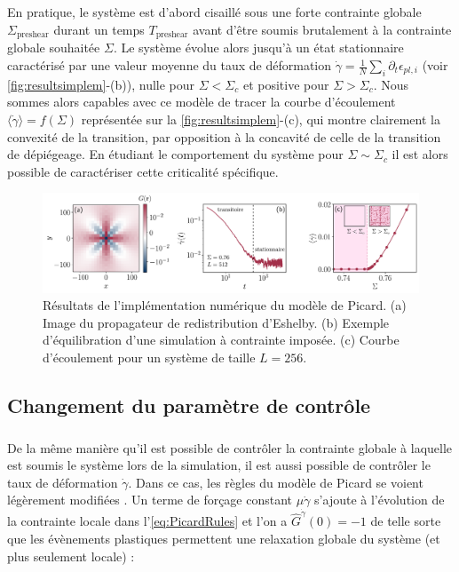 \subparagraph{}En pratique, le système est d'abord cisaillé sous une forte contrainte globale $\Sigma_\text{preshear}$ durant un temps $T_\text{preshear}$ avant d'être soumis brutalement à la contrainte globale souhaitée $\Sigma$. Le système évolue alors jusqu'à un état stationnaire caractérisé par une valeur moyenne du taux de déformation $ \dot{\gamma}  = \frac{1}{N}\sum_{i}\partial_t\epsilon_{pl,i}$ (voir \autoref{fig:resultsimplem}-(b)), nulle pour $\Sigma<\Sigma_c$ et positive pour $\Sigma>\Sigma_c$. Nous sommes alors capables avec ce modèle de tracer la courbe d'écoulement $\langle \dot{\gamma} \rangle = f(\Sigma)$ représentée sur la \autoref{fig:resultsimplem}-(c), qui montre clairement la convexité de la transition, par opposition à la concavité de celle de la transition de dépiégeage. En étudiant le comportement du système pour $\Sigma \sim \Sigma_c$ il est alors possible de caractériser cette criticalité spécifique.

\begin{figure}[h]
	\centering
	\includegraphics[width=\textwidth]{Chapitre4/Figures/Methode/ModeleResults.pdf}
	\caption{Résultats de l'implémentation numérique du modèle de Picard. (a) Image du propagateur de redistribution d'Eshelby. (b) Exemple d'équilibration d'une simulation à contrainte imposée. (c) Courbe d'écoulement pour un système de taille $L=256$.}
	\label{fig:resultsimplem}
\end{figure}

\subsection{Changement du paramètre de contrôle}

\label{sec:chgtcontrole}

\subparagraph{}De la même manière qu'il est possible de contrôler la contrainte globale à laquelle est soumis le système lors de la simulation, il est aussi possible de contrôler le taux de déformation $\dot{\gamma}$. Dans ce cas, les règles du modèle de Picard se voient légèrement modifiées \cite{picard_slow_2005}. Un terme de forçage  constant $\mu\dot{\gamma}$ s'ajoute à l'évolution de la contrainte locale dans l'\autoref{eq:PicardRules} et l'on a $\hat{G}^{\dot{\gamma}}(0) = -1$ de telle sorte que les évènements plastiques permettent une relaxation globale du système (et plus seulement locale) :

